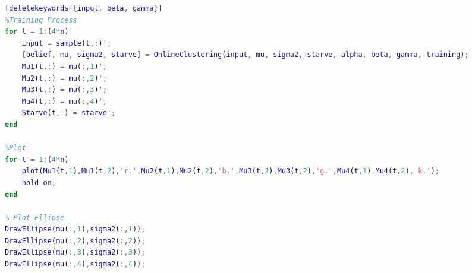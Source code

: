 \begin{spacing}{1}
\begin{lstlisting}[language=Matlab][deletekeywords={input, beta, gamma}]
%Training Process
for t = 1:(4*n)
    input = sample(t,:)';
    [belief, mu, sigma2, starve] = OnlineClustering(input, mu, sigma2, starve, alpha, beta, gamma, training);
    Mu1(t,:) = mu(:,1)';
    Mu2(t,:) = mu(:,2)';
    Mu3(t,:) = mu(:,3)';
    Mu4(t,:) = mu(:,4)';
    Starve(t,:) = starve';
end

%Plot
for t = 1:(4*n)
    plot(Mu1(t,1),Mu1(t,2),'r.',Mu2(t,1),Mu2(t,2),'b.',Mu3(t,1),Mu3(t,2),'g.',Mu4(t,1),Mu4(t,2),'k.');
    hold on;
end

% Plot Ellipse
DrawEllipse(mu(:,1),sigma2(:,1));
DrawEllipse(mu(:,2),sigma2(:,2));
DrawEllipse(mu(:,3),sigma2(:,3));
DrawEllipse(mu(:,4),sigma2(:,4));

\end{lstlisting}
\end{spacing}

